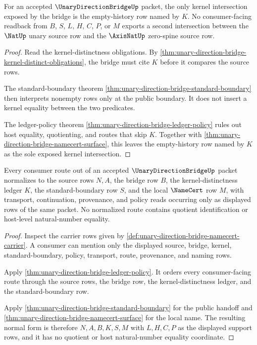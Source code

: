 \begin{theorem}
\label{thm:unary-direction-bridge-empty-intersection-readback}
For an accepted $\UnaryDirectionBridgeUp$ packet, the only kernel intersection
exposed by the bridge is the empty-history row named by $K$. No consumer-facing
readback from $B$, $S$, $L$, $H$, $C$, $P$, or $M$ exports a second intersection
between the $\NatUp$ unary source row and the $\AxisNatUp$ zero-spine source row.
\end{theorem}
\begin{proof}
Read the kernel-distinctness obligations. By
\autoref{thm:unary-direction-bridge-kernel-distinct-obligations}, the bridge
must cite $K$ before it compares the source rows.

The standard-boundary theorem \autoref{thm:unary-direction-bridge-standard-boundary}
then interprets nonempty rows only at the public boundary. It does not insert a
kernel equality between the two predicates.

The ledger-policy theorem \autoref{thm:unary-direction-bridge-ledger-policy}
rules out host equality, quotienting, and routes that skip $K$. Together with
\autoref{thm:unary-direction-bridge-namecert-surface}, this leaves the
empty-history row named by $K$ as the sole exposed kernel intersection.
\end{proof}

\begin{theorem}
\label{thm:unary-direction-bridge-consumer-normal-form}
Every consumer route out of an accepted $\UnaryDirectionBridgeUp$ packet
normalizes to the source rows $N,A$, the bridge row $B$, the kernel-distinctness
ledger $K$, the standard-boundary row $S$, and the local $\NameCert$ row $M$,
with transport, continuation, provenance, and policy reads occurring only as
displayed rows of the same packet. No normalized route contains quotient
identification or host-level natural-number equality.
\end{theorem}
\begin{proof}
Inspect the carrier rows given by
\autoref{def:unary-direction-bridge-namecert-carrier}. A consumer can mention
only the displayed source, bridge, kernel, standard-boundary, policy, transport,
route, provenance, and naming rows.

Apply \autoref{thm:unary-direction-bridge-ledger-policy}. It orders every
consumer-facing route through the source rows, the bridge row, the
kernel-distinctness ledger, and the standard-boundary row.

Apply \autoref{thm:unary-direction-bridge-standard-boundary} for the public
handoff and \autoref{thm:unary-direction-bridge-namecert-surface} for the local
name. The resulting normal form is therefore $N,A,B,K,S,M$ with $L,H,C,P$ as
the displayed support rows, and it has no quotient or host natural-number
equality coordinate.
\end{proof}

